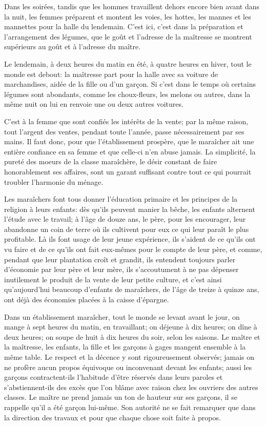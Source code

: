 \documentclass[10pt,a4paper]{book}
\begin{document}
Dans les soirées, tandis que les hommes travaillent dehors encore bien avant dans la nuit, les femmes préparent et montent les voies, les hottes, les mannes et les mannettes pour la halle du lendemain. C'est ici, c'est dans la préparation et l'arrangement des légumes, que le goût et l'adresse de la maîtresse se montrent supérieurs au goût et à l'adresse du maître.

Le lendemain, à deux heures du matin en été, à quatre heures en hiver, tout le monde est debout: la maîtresse part pour la halle avec sa voiture de marchandises, aidée de la fille ou d'un garçon. Si c'est dans le temps où certains légumes sont abondants, comme les choux-fleurs, les melons ou autres, dans la même nuit on lui en renvoie une ou deux autres voitures.

C'est à la femme que sont confiés les intérêts de la vente; par la même raison, tout l'argent des ventes, pendant toute l'année, passe nécessairement par ses mains. Il faut donc, pour que l'établissement prospère, que le maraîcher ait une entière confiance en sa femme et que celle-ci n'en abuse jamais. La simplicité, la pureté des moeurs de la classe maraîchère, le désir constant de faire honorablement ses affaires, sont un garant suffisant contre tout ce qui pourrait troubler l'harmonie du ménage.

Les maraîchers font tous donner l'éducation primaire et les principes de la religion à leurs enfants: dès qu'ils peuvent manier la bêche, les enfants alternent l'étude avec le travail; à l'âge de douze ans, le père, pour les encourager, leur abandonne un coin de terre où ils cultivent pour eux ce qui leur paraît le plus profitable. Là ils font usage de leur jeune expérience, ils s'aident de ce qu'ils ont vu faire et de ce qu'ils ont fait eux-mêmes pour le compte de leur père, et comme, pendant que leur plantation croît et grandit, ils entendent toujours parler d'économie par leur père et leur mère, ils s'accoutument à ne pas dépenser inutilement le produit de la vente de leur petite culture, et c'est ainsi qu'aujourd'hui beaucoup d'enfants de maraîchers, de l'âge de treize à quinze ans, ont déjà des économies placées à la caisse d'épargne.

Dans un établissement maraîcher, tout le monde se levant avant le jour, on mange à sept heures du matin, en travaillant; on déjeune à dix heures; on dîne à deux heures; on soupe de huit à dix heures du soir, selon les saisons. Le maître et la maîtresse, les enfants, la fille et les garçons à gages mangent ensemble à la même table. Le respect et la décence y sont rigoureusement observés; jamais on ne profère aucun propos équivoque ou inconvenant devant les enfants; aussi les garçons contractent-ils l'habitude d'être réservés dans leurs paroles et s'abstiennent-ils des excès que l'on blâme avec raison chez les ouvriers des autres classes. Le maître ne prend jamais un ton de hauteur sur ses garçons, il se rappelle qu'il a été garçon lui-même. Son autorité ne se fait remarquer que dans la direction des travaux et pour que chaque chose soit faite à propos.
\end{document}
